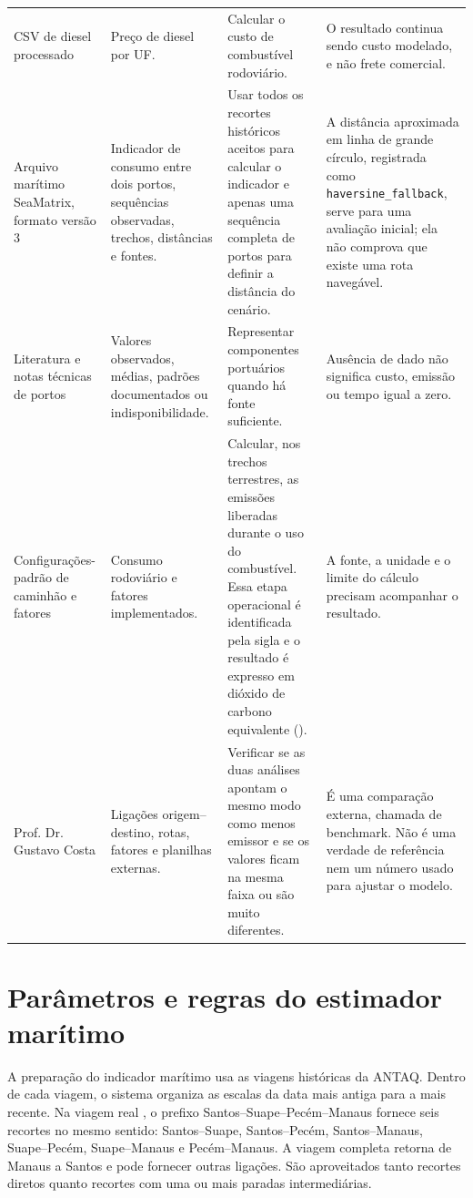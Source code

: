 \begin{longtable}{L{0.20\textwidth}L{0.25\textwidth}L{0.25\textwidth}L{0.22\textwidth}}
CSV de diesel processado & Preço de diesel por UF. & Calcular o custo de combustível rodoviário. & O resultado continua sendo custo modelado, e não frete comercial.\\
Arquivo marítimo SeaMatrix, formato versão 3 & Indicador de consumo entre dois portos, sequências observadas, trechos, distâncias e fontes. & Usar todos os recortes históricos aceitos para calcular o indicador e apenas uma sequência completa de portos para definir a distância do cenário. & A distância aproximada em linha de grande círculo, registrada como \texttt{haversine\_fallback}, serve para uma avaliação inicial; ela não comprova que existe uma rota navegável.\\
Literatura e notas técnicas de portos & Valores observados, médias, padrões documentados ou indisponibilidade. & Representar componentes portuários quando há fonte suficiente. & Ausência de dado não significa custo, emissão ou tempo igual a zero.\\
Configurações-padrão de caminhão e fatores & Consumo rodoviário e fatores implementados. & Calcular, nos trechos terrestres, as emissões liberadas durante o uso do combustível. Essa etapa operacional é identificada pela sigla \ttw{} e o resultado é expresso em dióxido de carbono equivalente (\cooe{}). & A fonte, a unidade e o limite do cálculo precisam acompanhar o resultado.\\
Prof. Dr. Gustavo Costa & Ligações origem--destino, rotas, fatores e planilhas externas. & Verificar se as duas análises apontam o mesmo modo como menos emissor e se os valores ficam na mesma faixa ou são muito diferentes. & É uma comparação externa, chamada de benchmark. Não é uma verdade de referência nem um número usado para ajustar o modelo.\\
\bottomrule
\end{longtable}
\endgroup

\section{Parâmetros e regras do estimador marítimo}
\label{sec:app-parametros-maritimos}

A preparação do indicador marítimo usa as viagens históricas da ANTAQ. Dentro de cada viagem, o sistema organiza as escalas da data mais antiga para a mais recente. Na viagem real , o prefixo Santos--Suape--Pecém--Manaus fornece seis recortes no mesmo sentido: Santos--Suape, Santos--Pecém, Santos--Manaus, Suape--Pecém, Suape--Manaus e Pecém--Manaus. A viagem completa retorna de Manaus a Santos e pode fornecer outras ligações. São aproveitados tanto recortes diretos quanto recortes com uma ou mais paradas intermediárias.


